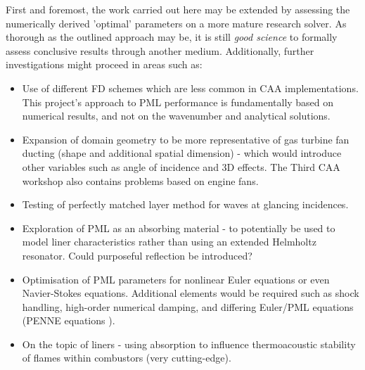 First and foremost, the work carried out here may be extended by assessing the numerically derived 'optimal' parameters on a more mature research solver. As thorough as the outlined approach may be, it is still \textit{good science} to formally assess conclusive results through another medium. Additionally, further investigations might proceed in areas such as:
\begin{itemize}
    \itemsep0em
    \item Use of different FD schemes which are less common in CAA implementations. This project's approach to PML performance is fundamentally based on numerical results, and not on the wavenumber and analytical solutions.
    \item Expansion of domain geometry to be more representative of gas turbine fan ducting (shape and additional spatial dimension) - which would introduce other variables such as angle of incidence and 3D effects. The Third CAA workshop \cite{dahl2000caaworkshop} also contains problems based on engine fans.
    \item Testing of perfectly matched layer method for waves at glancing incidences.
    \item Exploration of PML as an absorbing material - to potentially be used to model liner characteristics rather than using an extended Helmholtz resonator. Could purposeful reflection be introduced?
    \item Optimisation of PML parameters for nonlinear Euler equations or even Navier-Stokes equations. Additional elements would be required such as shock handling, high-order numerical damping, and differing Euler/PML equations (PENNE equations \cite{long2000nonconservative}).
    \item On the topic of liners - using absorption to influence thermoacoustic stability of flames within combustors (very cutting-edge).
\end{itemize}

